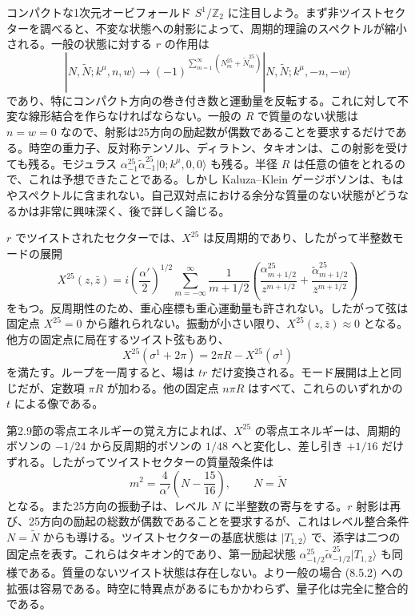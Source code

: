 コンパクトな1次元オービフォールド $S^1/\mathbb Z_2$ に注目しよう。まず非ツイストセクターを調べると、不変な状態への射影によって、周期的理論のスペクトルが縮小される。一般の状態に対する $r$ の作用は
\begin{equation}
|N,\widetilde N;k^\mu,n,w\rangle
\longrightarrow
(-1)^{\sum_{m=1}^{\infty}(N_m^{25}+\widetilde N_m^{25})}
|N,\widetilde N;k^\mu,-n,-w\rangle
\tag{8.5.5}\label{eq:8.5.5}
\end{equation}
であり、特にコンパクト方向の巻き付き数と運動量を反転する。これに対して不変な線形結合を作らなければならない。一般の $R$ で質量のない状態は $n=w=0$ なので、射影は25方向の励起数が偶数であることを要求するだけである。時空の重力子、反対称テンソル、ディラトン、タキオンは、この射影を受けても残る。モジュラス $\alpha_{-1}^{25}\widetilde\alpha_{-1}^{25}|0;k^\mu,0,0\rangle$ も残る。半径 $R$ は任意の値をとれるので、これは予想できたことである。しかし Kaluza--Klein ゲージボソンは、もはやスペクトルに含まれない。自己双対点における余分な質量のない状態がどうなるかは非常に興味深く、後で詳しく論じる。

$r$ でツイストされたセクターでは、$X^{25}$ は反周期的であり、したがって半整数モードの展開
\begin{equation}
X^{25}(z,\bar z)=i\left(\frac{\alpha'}2\right)^{1/2}
\sum_{m=-\infty}^{\infty}\frac1{m+1/2}
\left(\frac{\alpha_{m+1/2}^{25}}{z^{m+1/2}}
+\frac{\widetilde\alpha_{m+1/2}^{25}}{\bar z^{m+1/2}}\right)
\tag{8.5.6}\label{eq:8.5.6}
\end{equation}
をもつ。反周期性のため、重心座標も重心運動量も許されない。したがって弦は固定点 $X^{25}=0$ から離れられない。振動が小さい限り、$X^{25}(z,\bar z)\approx0$ となる。他方の固定点に局在するツイスト弦もあり、
\begin{equation}
X^{25}(\sigma^1+2\pi)=2\pi R-X^{25}(\sigma^1)
\tag{8.5.7}\label{eq:8.5.7}
\end{equation}
を満たす。ループを一周すると、場は $tr$ だけ変換される。モード展開は上と同じだが、定数項 $\pi R$ が加わる。他の固定点 $n\pi R$ はすべて、これらのいずれかの $t$ による像である。

第2.9節の零点エネルギーの覚え方によれば、$X^{25}$ の零点エネルギーは、周期的ボソンの $-1/24$ から反周期的ボソンの $1/48$ へと変化し、差し引き $+1/16$ だけずれる。したがってツイストセクターの質量殻条件は
\begin{equation}
m^2=\frac4{\alpha'}\left(N-\frac{15}{16}\right),\qquad N=\widetilde N
\tag{8.5.8}\label{eq:8.5.8}
\end{equation}
となる。また25方向の振動子は、レベル $N$ に半整数の寄与をする。$r$ 射影は再び、25方向の励起の総数が偶数であることを要求するが、これはレベル整合条件 $N=\widetilde N$ からも導ける。ツイストセクターの基底状態は $|T_{1,2}\rangle$ で、添字は二つの固定点を表す。これらはタキオン的であり、第一励起状態 $\alpha_{-1/2}^{25}\widetilde\alpha_{-1/2}^{25}|T_{1,2}\rangle$ も同様である。質量のないツイスト状態は存在しない。より一般の場合 (8.5.2) への拡張は容易である。時空に特異点があるにもかかわらず、量子化は完全に整合的である。

